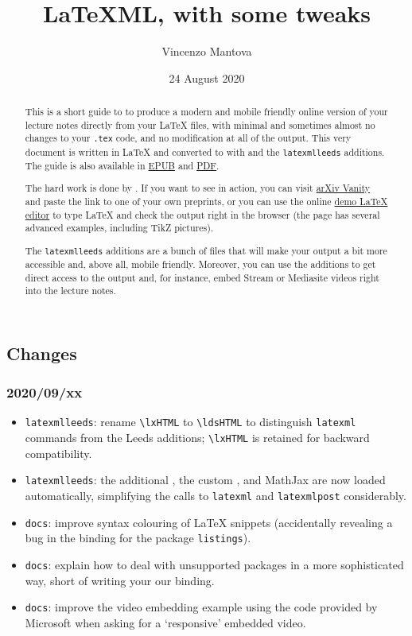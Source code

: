 \documentclass[a4paper]{article}
\title{LaTeXML, with some tweaks}
\author{Vincenzo Mantova}
\date{24 August 2020}
\def\ltxinline{\lstinline[style=latexml]}
\theoremstyle{definition}
\begin{document}
\maketitle

\begin{abstract}
  This is a short guide to \LaTeXML{} to produce a modern and mobile friendly online version of your lecture notes directly from your \LaTeX{} files, with minimal and sometimes almost no changes to your \verb|.tex| code, and no modification at all of the \HTML{} output. This very document is written in \LaTeX{} and converted to \HTML{} with \LaTeXML{} and the \verb|latexmlleeds| additions. The guide is also available in \href{LaTeXML-Leeds.epub}{EPUB} and \href{LaTeXML-Leeds.pdf}{PDF}.

  The hard work is done by \LaTeXML{}. If you want to see \LaTeXML{} in action, you can visit \href{https://www.arxiv-vanity.com/}{arXiv Vanity} and paste the link to one of your own preprints, or you can use the online \href{https://latexml.mathweb.org/editor}{demo \LaTeX{} editor} to type \LaTeX{} and check the \HTML{} output right in the browser (the page has several advanced examples, including TikZ pictures).

  The \verb|latexmlleeds| additions are a bunch of files that will make your output a bit more accessible and, above all, mobile friendly. Moreover, you can use the additions to get direct access to the \HTML{} output and, for instance, embed Stream or Mediasite videos right into the lecture notes.
\end{abstract}

\subsection*{Changes}
\subsubsection*{2020/09/xx}
\begin{itemize}
  \item \verb|latexmlleeds|: rename \ltxinline{\lxHTML} to \ltxinline{\ldsHTML} to distinguish \verb|latexml| commands from the Leeds additions; \ltxinline{\lxHTML} is retained for backward compatibility.
  \item \verb|latexmlleeds|: the additional \CSS{}, the custom \XSLT{}, and MathJax are now loaded automatically, simplifying the calls to \verb|latexml| and \verb|latexmlpost| considerably.
  \item \verb|docs|: improve syntax colouring of \LaTeX{} snippets (accidentally revealing a bug in the \LaTeXML{} binding for the package \verb|listings|).
  \item \verb|docs|: explain how to deal with unsupported packages in a more sophisticated way, short of writing your our \LaTeXML{} binding.
  \item \verb|docs|: improve the video embedding example using the code provided by Microsoft when asking for a `responsive' embedded video.
\end{itemize}
\end{document}
